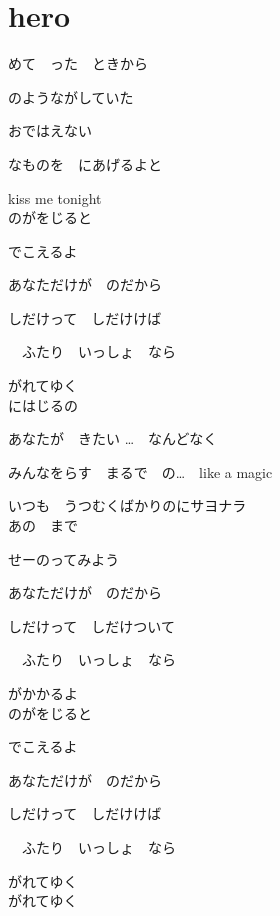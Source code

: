 \section{ hero}
\large{

めて　った　ときから

のようながしていた

おではえない

なものを　にあげるよと

kiss me tonight
\\

のがをじると

でこえるよ

あなただけが　のだから

しだけって　しだけけば

　ふたり　いっしょ　なら

がれてゆく
\\

にはじるの

あなたが　きたい …　なんどなく

みんなをらす　まるで　の…　like a magic

いつも　うつむくばかりのにサヨナラ
\\

あの　まで

せーのってみよう

あなただけが　のだから

しだけって　しだけついて

　ふたり　いっしょ　なら

がかかるよ
\\

のがをじると

でこえるよ

あなただけが　のだから

しだけって　しだけけば

　ふたり　いっしょ　なら

がれてゆく
\\

がれてゆく

}
